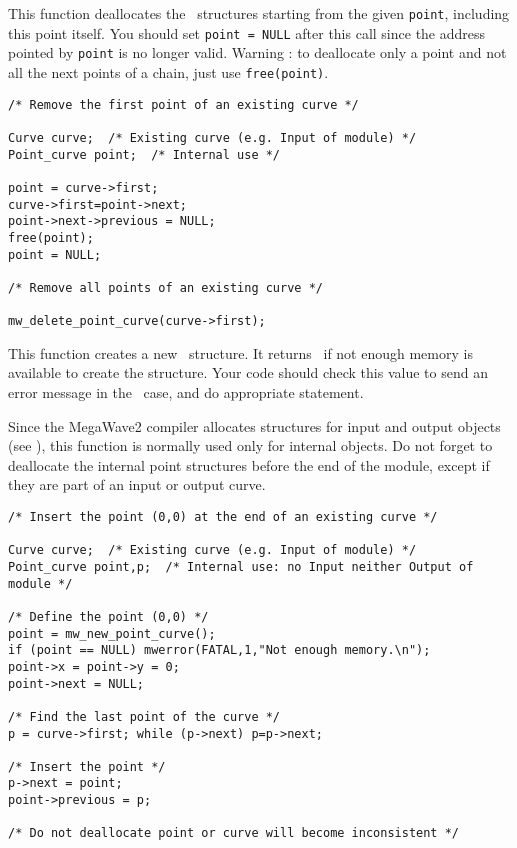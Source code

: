 \newpage %


\Description
This function deallocates the \point\ structures starting from
the given \verb+point+, including this point itself.
You should set \verb+point = NULL+ after this call since the address pointed
by \verb+point+ is no longer valid.
Warning : to deallocate only a point and not all the next points of a 
chain, just use \verb+free(point)+.

\Next
\Example
\begin{verbatim}
/* Remove the first point of an existing curve */

Curve curve;  /* Existing curve (e.g. Input of module) */
Point_curve point;  /* Internal use */

point = curve->first;
curve->first=point->next;
point->next->previous = NULL;
free(point);
point = NULL;

/* Remove all points of an existing curve */

mw_delete_point_curve(curve->first);
\end{verbatim}

\newpage %


\Description
This function creates a new \point\ structure.
It returns \Null\ if not enough memory is available to create the structure.
Your code should check this value to send an
error message in the \Null\ case, and do appropriate statement.

Since the MegaWave2 compiler allocates structures for input and output 
objects (see \volI), this function is normally used only for internal objects.
Do not forget to deallocate the internal point structures before the end
of the module, except if they are part of an input or output curve.

\Next
\Example
\begin{verbatim}
/* Insert the point (0,0) at the end of an existing curve */

Curve curve;  /* Existing curve (e.g. Input of module) */
Point_curve point,p;  /* Internal use: no Input neither Output of module */

/* Define the point (0,0) */
point = mw_new_point_curve();
if (point == NULL) mwerror(FATAL,1,"Not enough memory.\n");
point->x = point->y = 0;
point->next = NULL;

/* Find the last point of the curve */
p = curve->first; while (p->next) p=p->next;

/* Insert the point */
p->next = point;
point->previous = p;

/* Do not deallocate point or curve will become inconsistent */ 
\end{verbatim}
\newpage %

